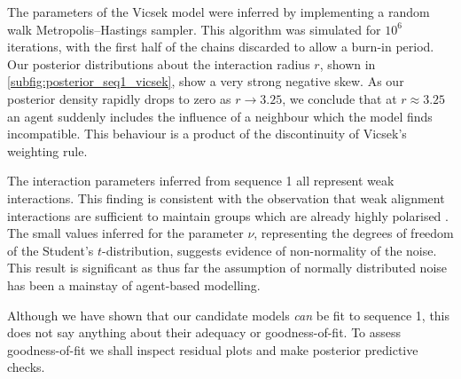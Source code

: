 The parameters of the Vicsek model were inferred by implementing a random walk
Metropolis--Hastings sampler. This algorithm was simulated for $10^6$
iterations, with the first half of the chains discarded to allow a burn-in
period. Our posterior distributions about the interaction radius $r$, shown in
\cref{subfig:posterior_seq1_vicsek}, show a very strong negative skew. As our
posterior density rapidly drops to zero as $r\rightarrow3.25$, we conclude  
that at $r\approx3.25$ an agent suddenly includes the influence of a neighbour
which the model finds incompatible. This behaviour is a product of the
discontinuity of Vicsek's weighting rule.

The interaction parameters inferred from sequence 1 all represent weak
interactions. This finding is consistent with the observation that weak
alignment interactions are sufficient to maintain groups which are already
highly polarised \parencite{jhawar20}. The small values inferred for the
parameter $\nu$, representing the degrees of freedom of the Student's
$t$-distribution, suggests evidence of non-normality of the noise. This result
is significant as thus far the assumption of normally distributed noise has
been a mainstay of agent-based modelling.

Although we have shown that our candidate models \emph{can} be fit to sequence
1, this does not say anything about their adequacy or goodness-of-fit. To
assess goodness-of-fit we shall inspect residual plots and make posterior
predictive checks.

